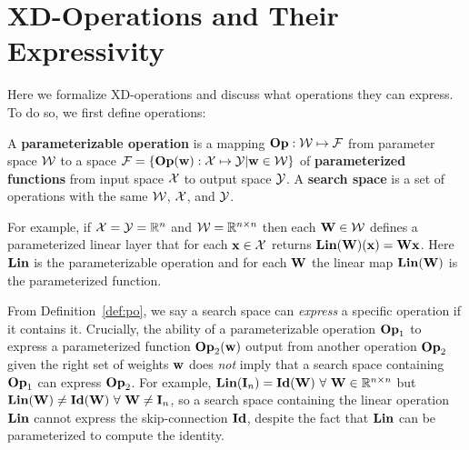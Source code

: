 \section{XD-Operations and Their Expressivity}\label{sec:xd}

Here we formalize XD-operations and discuss what operations they can express.
To do so, we first define operations:
\begin{Def}\label{def:po}
	A {\bf parameterizable operation} is a mapping $\Op:\W\mapsto\F$ from parameter space $\W$ to a space $\F=\{\Op(\*w):\X\mapsto\Y\vert\*w\in\W\}$ of {\bf parameterized functions} from input space $\X$ to output space $\Y$.
	A {\bf search space} is a set of operations with the same $\W$, $\X$, and $\Y$.
\end{Def}

For example, if $\X=\Y=\R^n$ and $\W=\R^{n\times n}$ then each $\*W\in\W$ defines a parameterized linear layer that for each $\*x\in\X$ returns $\Lin(\*W)(\*x)=\*W\*x$.
Here $\Lin$ is the parameterizable operation and for each $\*W$ the linear map $\Lin(\*W)$ is the parameterized function.

From Definition~\ref{def:po}, we say a search space can {\em express} a specific operation if it contains it.
Crucially, the ability of a parameterizable operation $\Op_1$ to express a parameterized function $\Op_2(\*w)$ output from another operation $\Op_2$ given the right set of weights $\*w$ does {\em not} imply that a search space containing $\Op_1$ can express $\Op_2$.
For example, $\Lin(\*I_n)=\Id(\*W)~\forall~\*W\in\R^{n\times n}$ but $\Lin(\*W)\ne\Id(\*W)~\forall~\*W\ne\*I_n$, so a search space containing the linear operation $\Lin$ cannot express the skip-connection $\Id$, despite the fact that $\Lin$ can be parameterized to compute the identity.

